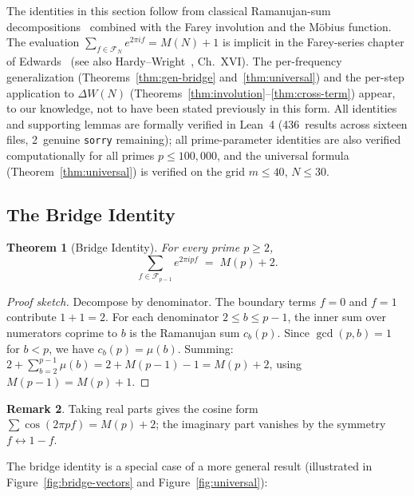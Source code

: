 \documentclass[11pt]{article}
\newtheorem{theorem}{Theorem}[section]
\theoremstyle{definition}
\newtheorem{remark}[theorem]{Remark}
\newcommand{\F}{\mathcal{F}}
\begin{document}
The identities in this section follow from classical
Ramanujan-sum decompositions~\cite{Ramanujan1918, Kanemitsu1982}
combined with the Farey involution and the M\"obius function.
The evaluation $\sum_{f \in \F_N} e^{2\pi i f} = M(N)+1$ is
implicit in the Farey-series chapter of Edwards~\cite{Edwards1974}
(see also Hardy--Wright~\cite{HardyWright2008}, Ch.~XVI\@).
The per-frequency generalization (Theorems~\ref{thm:gen-bridge}
and~\ref{thm:universal}) and the per-step application to
$\Delta W(N)$ (Theorems~\ref{thm:involution}--\ref{thm:cross-term})
appear, to our knowledge, not to have been stated previously
in this form.  All identities and supporting lemmas are
formally verified in Lean~4 (436~results across sixteen files,
2~genuine \texttt{sorry} remaining); all prime-parameter identities
are also verified
computationally for all primes $p \le 100{,}000$, and the universal
formula (Theorem~\ref{thm:universal}) is verified on the grid
$m \le 40$, $N \le 30$.

\subsection{The Bridge Identity}

\begin{theorem}[Bridge Identity]\label{thm:bridge}
For every prime $p \ge 2$,
\begin{equation}\label{eq:bridge}
  \sum_{f \in \F_{p-1}} e^{2\pi i p f}
  \;=\; M(p) + 2.
\end{equation}
\end{theorem}

\begin{proof}[Proof sketch]
Decompose by denominator.  The boundary terms $f = 0$ and $f = 1$
contribute $1 + 1 = 2$.  For each denominator $2 \le b \le p-1$,
the inner sum over numerators coprime to $b$ is the Ramanujan sum
$c_b(p)$.  Since $\gcd(p, b) = 1$ for $b < p$, we have
$c_b(p) = \mu(b)$.  Summing: $2 + \sum_{b=2}^{p-1} \mu(b) =
2 + M(p-1) - 1 = M(p) + 2$, using $M(p-1) = M(p) + 1$.
\end{proof}

\begin{remark}
Taking real parts gives the cosine form
$\sum \cos(2\pi pf) = M(p) + 2$;
the imaginary part vanishes by the symmetry $f \leftrightarrow 1 - f$.
\end{remark}

The bridge identity is a special case of a more general result
(illustrated in Figure~\ref{fig:bridge-vectors} and Figure~\ref{fig:universal}):
\end{document}
